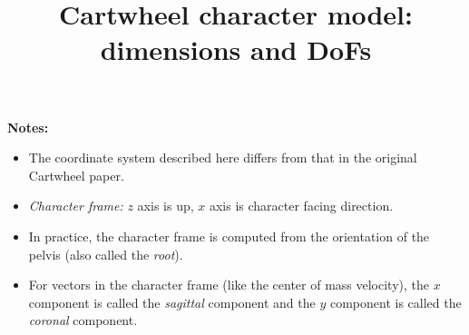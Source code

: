 \documentclass[a4paper]{article}
\title{Cartwheel character model: dimensions and DoFs}
\begin{document}



\pgfmathsetmacro{\lowerLegSizeZ}{\legSizeZ * \kneeRelativePosZ}
\pgfmathsetmacro{\upperLegSizeZ}{\legSizeZ - \lowerLegSizeZ}

\pgfmathsetmacro{\anklePosZ}{\footSizeZ}
\pgfmathsetmacro{\kneePosZ}{\anklePosZ + \legSizeZ * \kneeRelativePosZ}
\pgfmathsetmacro{\hipPosZ}{\anklePosZ + \legSizeZ}


\maketitle
\textbf{Notes:}
\begin{itemize}
\item The coordinate system described here differs from that in the original Cartwheel paper.
\item \textit{Character frame:} $z$ axis is up, $x$ axis is character facing direction.
\item In practice, the character frame is computed from the orientation of the pelvis (also called the \textit{root}).
\item For vectors in the character frame (like the center of mass velocity), the $x$ component is called the \textit{sagittal} component and the $y$ component is called the \textit{coronal} component.
\end{itemize}
\end{document}
